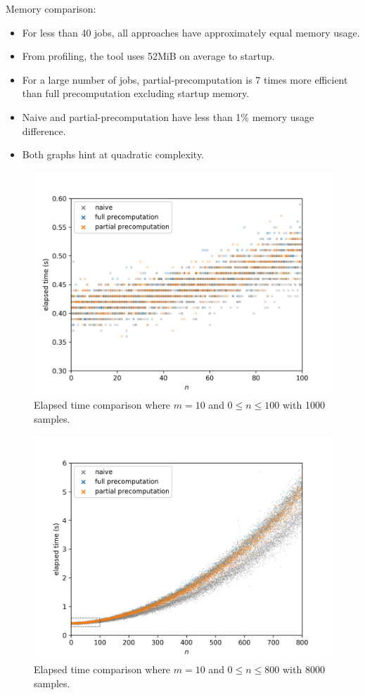Memory comparison:
\begin{itemize}
	\item For less than 40 jobs, all approaches have approximately equal memory usage.
	\item From profiling, the tool uses 52MiB on average to startup.
	\item For a large number of jobs, partial-precomputation is 7 times more efficient than full precomputation excluding startup memory.
	\item Naive and partial-precomputation have less than 1\% memory usage difference.
	\item Both graphs hint at quadratic complexity.
\end{itemize}
\begin{figure}[H]
	\centering
	\includegraphics[scale=0.7]{figures/precomputation_cpu_small}
	\caption{Elapsed time comparison where $m=10$ and $0\leq n\leq 100$ with 1000 samples.}
\end{figure}

\begin{figure}[H]
	\centering
	\includegraphics[scale=0.7]{figures/precomputation_cpu_big}
	\caption{Elapsed time comparison where $m=10$ and $0\leq n\leq 800$ with 8000 samples.}
\end{figure}

